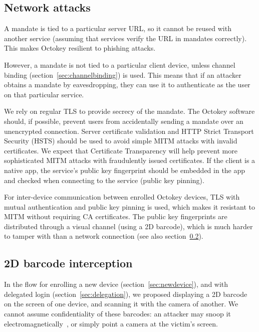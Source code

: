 \subsection{Network attacks}\label{sec:netattack}

A mandate is tied to a particular server URL, so it cannot be reused with another service (assuming
that services verify the URL in mandates correctly). This makes Octokey resilient to phishing
attacks.

However, a mandate is not tied to a particular client device, unless channel binding
(section~\ref{sec:channelbinding}) is used. This means that if an attacker obtains a mandate by
eavesdropping, they can use it to authenticate as the user on that particular service.

We rely on regular TLS to provide secrecy of the mandate. The Octokey software should, if possible,
prevent users from accidentally sending a mandate over an unencrypted connection. Server certificate
validation and HTTP Strict Transport Security (HSTS) should be used to avoid simple MITM attacks
with invalid certificates. We expect that Certificate Transparency will help prevent more
sophisticated MITM attacks with fraudulently issued certificates. If the client is a native app, the
service's public key fingerprint should be embedded in the app and checked when connecting to the
service (public key pinning).

For inter-device communication between enrolled Octokey devices, TLS with mutual authentication and
public key pinning is used, which makes it resistant to MITM without requiring CA certificates. The
public key fingerprints are distributed through a visual channel (using a 2D barcode), which is much
harder to tamper with than a network connection (see also section~\ref{sec:barcode-intercept}).

\subsection{2D barcode interception}\label{sec:barcode-intercept}

In the flow for enrolling a new device (section~\ref{sec:newdevice}), and with delegated login
(section~\ref{sec:delegation}), we proposed displaying a 2D barcode on the screen of one device, and
scanning it with the camera of another. We cannot assume confidentiality of these barcodes: an
attacker may snoop it electromagnetically~\cite{Kuhn05}, or simply point a camera at the victim's
screen.

